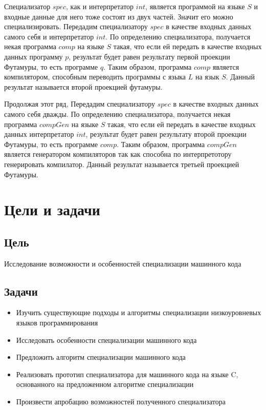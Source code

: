 \documentclass{spbau-diploma}
\begin{document}
Специализатор $spec$, как и интерпретатор $int$, является программой на языке $S$ и входные данные для него тоже состоят из двух частей. Значит его можно специализировать. Передадим специализатору $spec$ в качестве входных данных самого себя и интерпретатор $int$. По определению специализатора, получается некая программа $comp$ на языке $S$ такая, что если ей передать в качестве входных данных программу $p$, результат будет равен результату первой проекции Футамуры, то есть программе $q$. Таким образом, программа $comp$ является компилятором, способным переводить программы с языка $L$ на язык $S$. Данный результат называется второй проекцией футамуры.

Продолжая этот ряд, Передадим специализатору $spec$ в качестве входных данных самого себя дважды. По определению специализатора, получается некая программа $compGen$ на языке $S$ такая, что если ей передать в качестве входных данных интерпретатор $int$, результат будет равен результату второй проекции Футамуры, то есть программе $comp$. Таким образом, программа $compGen$ является генератором компиляторов так как способна по интерпретотору генерировать компилатор. Данный результат называется третьей проекцией Футамуры. 


\section{Цели и задачи}

\subsection{Цель}
Исследование возможности и особенностей специализации машинного кода

\subsection{Задачи}
\begin{itemize}
\item Изучить существующие подходы и алгоритмы специализации низкоуровневых языков программирования
\item Исследовать особенности специализации машинного кода
\item Предложить алгоритм специализации машинного кода
\item Реализовать прототип специализатора для машинного кода на языке C, основанного на предложенном алгоритме специализации
\item Произвести апробацию возможностей полученного специализатора
\end{itemize}
\end{document}
